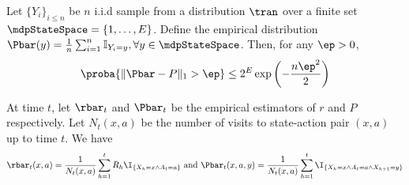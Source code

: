             \begin{thm}
            \label{thm:weissman}
                Let $\{Y_i\}_{i\le n}$ be $n$ i.i.d sample from a distribution $\tran$ over a finite set $\mdpStateSpace=\{1,\dots,E\}$. Define the empirical distribution $\Pbar(y)=\frac{1}{n}\sum_{i=1}^{n}\mathbb{I}_{Y_i=y}, \forall y\in\mdpStateSpace$. Then, for any $\ep>0$,
                \begin{align*}
                    \proba{\Vert\Pbar-P\Vert_1> \ep} \le 2^E\exp\left(-\frac{n\ep^2}{2}\right)
                \end{align*}
            \end{thm}
            
            At time $t$, let $\rbar_t$ and $\Pbar_t$ be the empirical estimators of $r$ and $P$ respectively.
            Let $N_t(x,a)$ be the number of visits to state-action pair $(x,a)$ up to time $t$.
            We have
            \begin{align*}
                \rbar_t(x,a) =\frac1{N_t(x,a)}\sum_{h=1}^{t}R_h\I_{\{X_h=x\wedge A_t=a\}} \text{ and } \Pbar_t(x,a,y) =\frac1{N_t(x,a)}\sum_{h=1}^{t}\I_{\{X_h=x\wedge A_t=a\wedge X_{h+1}=y\}}
            \end{align*}
            
